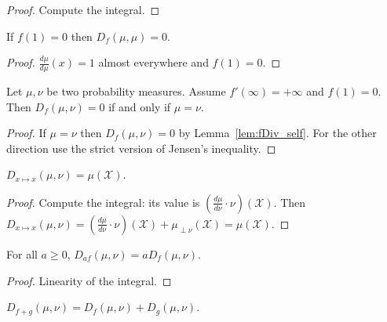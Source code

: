 \begin{proof} \leanok
Compute the integral.
\end{proof}


\begin{lemma}
  \label{lem:fDiv_self}
  \leanok
  If $f(1) = 0$ then $D_{f}(\mu, \mu) = 0$.
\end{lemma}

\begin{proof} \leanok
$\frac{d \mu}{d \mu}(x) = 1$ almost everywhere and $f(1) = 0$.
\end{proof}


\begin{lemma}
  \label{lem:fDiv_eq_zero_iff}
  \leanok
  Let $\mu, \nu$ be two probability measures. Assume $f'(\infty) = + \infty$ and $f(1) = 0$. Then $D_f(\mu, \nu) = 0$ if and only if $\mu = \nu$.
\end{lemma}

\begin{proof}\leanok
{}
If $\mu = \nu$ then $D_f(\mu, \nu) = 0$ by Lemma~\ref{lem:fDiv_self}.
For the other direction use the strict version of Jensen's inequality.
\end{proof}


\begin{lemma}
  \label{lem:fDiv_id}
  \leanok
  $D_{x \mapsto x}(\mu, \nu) = \mu(\mathcal X)$.
\end{lemma}

\begin{proof} \leanok
Compute the integral: its value is $(\frac{d\mu}{d\nu}\cdot \nu)(\mathcal X)$. Then
$D_{x\mapsto x}(\mu, \nu) = (\frac{d\mu}{d\nu}\cdot \nu)(\mathcal X) + \mu_{\perp \nu}(\mathcal X) = \mu (\mathcal X)$.
\end{proof}


\begin{lemma}
  \label{lem:fDiv_mul}
  \leanok
  For all $a \ge 0$, $D_{a f}(\mu, \nu) = a D_{f}(\mu, \nu)$.
\end{lemma}

\begin{proof}\leanok
Linearity of the integral.
\end{proof}


\begin{lemma}
  \label{lem:fDiv_add}
  \leanok
  $D_{f + g}(\mu, \nu) = D_f(\mu, \nu) + D_g(\mu, \nu)$.
\end{lemma}

